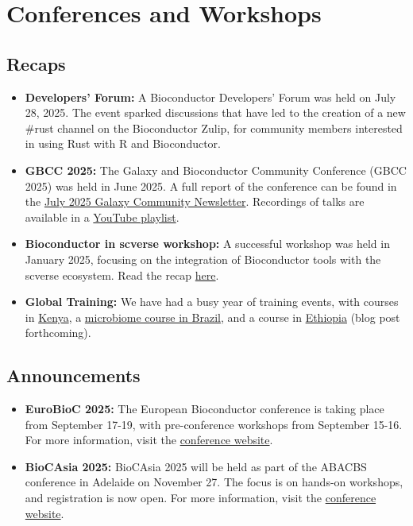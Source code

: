 \section{Conferences and Workshops}\label{conferences-and-workshops}

\subsection{Recaps}\label{recaps}

\begin{itemize}
\tightlist
\item
  \textbf{Developers' Forum:} A Bioconductor Developers' Forum was held on July 28, 2025. The event sparked discussions that have led to the creation of a new \#rust channel on the Bioconductor Zulip, for community members interested in using Rust with R and Bioconductor.
\item
  \textbf{GBCC 2025:} The Galaxy and Bioconductor Community Conference (GBCC 2025) was held in June 2025. A full report of the conference can be found in the \href{https://artifact.galaxyproject.org/news/2025-07-11-june2025-newsletter/}{July 2025 Galaxy Community Newsletter}. Recordings of talks are available in a \href{https://www.youtube.com/playlist?list=PLdl4u5ZRDMQTJ0O_FIO9ayqaUDfnMo4-4}{YouTube playlist}.
\item
  \textbf{Bioconductor in scverse workshop:} A successful workshop was held in January 2025, focusing on the integration of Bioconductor tools with the scverse ecosystem. Read the recap \href{https://blog.bioconductor.org/posts/2025-01-08-bioc-in-scverse-workshop/}{here}.
\item
  \textbf{Global Training:} We have had a busy year of training events, with courses in \href{https://blog.bioconductor.org/posts/2025-05-21-kenya-course/}{Kenya}, a \href{https://blog.bioconductor.org/posts/2025-07-10-microbiome-course-brazil/}{microbiome course in Brazil}, and a course in \href{https://training.bioconductor.org/workshops/2025-08-Addis-Ababa/index.html}{Ethiopia} (blog post forthcoming).
\end{itemize}

\subsection{Announcements}\label{announcements}

\begin{itemize}
\tightlist
\item
  \textbf{EuroBioC 2025:} The European Bioconductor conference is taking place from September 17-19, with pre-conference workshops from September 15-16. For more information, visit the \href{https://eurobioc2025.bioconductor.org/}{conference website}.
\item
  \textbf{BioCAsia 2025:} BioCAsia 2025 will be held as part of the ABACBS conference in Adelaide on November 27. The focus is on hands-on workshops, and registration is now open. For more information, visit the \href{https://biocasia2025.bioconductor.org/}{conference website}.
\end{itemize}

